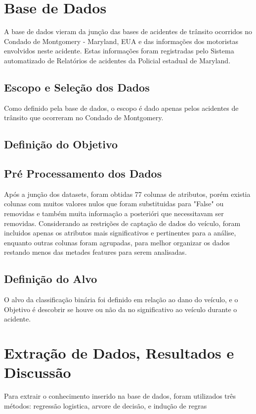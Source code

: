 \documentclass[conference]{IEEEtran}
\begin{document}
\section{Base de Dados}

A base de dados vieram da junção das bases de acidentes de trânsito\cite{incidents}
ocorridos no Condado de Montgomery - Maryland, EUA e das informações dos motoristas envolvidos neste acidente\cite{drivers}.
Estas informações foram registradas pelo Sistema automatizado de Relatórios de acidentes da Policial estadual de Maryland.  

\subsection{Escopo e Seleção dos Dados}
Como definido pela base de dados, o escopo é dado apenas pelos acidentes de trânsito que ocorreram no Condado de Montgomery. 
\subsection{Definição do Objetivo}


\subsection{Pré Processamento dos Dados}
Após a junção dos datasets, foram obtidas 77 colunas de atributos, porém existia colunas com muitos valores nulos que foram 
substituidas para "False" ou removidas e também muita  informação a posterióri que necessitavam ser removidas.
Considerando as restrições de captação de dados do veículo, foram incluidos apenas os atributos mais significativos e pertinentes para a análise, 
enquanto outras colunas foram agrupadas, para melhor organizar os dados restando menos das metades features para serem analisadas. 

\subsection{Definição do Alvo}
O alvo da classificação binária foi definido em relação ao dano do veículo, e o Objetivo é descobrir se houve ou não da
no significativo ao veículo durante o acidente.
\section{Extração de Dados, Resultados e Discussão}
Para extrair o conhecimento inserido na base de dados, 
foram utilizados três métodos: regressão logistica, arvore de decisão, e indução de regras
\end{document}

